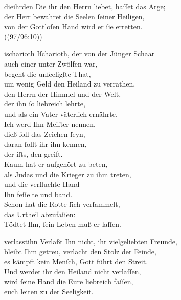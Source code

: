 \documentclass[tocstyle=ref-genre]{ees}
\begin{document}
{  \begin{movement}{dieihrden}
    \voice[Coro]
    Die ihr den Herrn liebet, haſſet das Arge;\\
    der Herr bewahret die Seelen ſeiner Heiligen,\\
    von der Gottloſen Hand wird er ſie erretten.\\
    ((97/96:10))
  \end{movement}

  \begin{movement}{ischarioth}
    \voice[Soprano]
    Iſcharioth, der von der Jünger Schaar\\
    auch einer unter Zwölfen war,\\
    begeht die unſeeligſte That,\\
    um wenig Geld den Heiland zu verrathen,\\
    den Herrn der Himmel und der Welt,\\
    der ihn ſo liebreich lehrte,\\
    und als ein Vater väterlich ernährte.\\
    Ich werd Ihn Meiſter nennen,\\
    dieß ſoll das Zeichen ſeyn,\\
    daran ſollt ihr ihn kennen,\\
    der iſts, den greift.\\
    Kaum hat er aufgehört zu beten,\\
    als Judas und die Krieger zu ihm treten,\\
    und die verfluchte Hand\\
    Ihn feſſelte und band.\\
    Schon hat die Rotte ſich verſammelt,\\
    das Urtheil abzufaſſen:\\
    Tödtet Ihn, ſein Leben muß er laſſen.
  \end{movement}

  \begin{movement}{verlasstihn}
    \voice[Soprano]
    Verlaßt Ihn nicht, ihr vielgeliebten Freunde,\\
    bleibt Ihm getreu, verlacht den Stolz der Feinde,\\
    es kämpft kein Menſch, Gott führt den Streit.\\[1ex]
    Und werdet ihr den Heiland nicht verlaſſen,\\
    wird ſeine Hand die Eure liebreich faſſen,\\
    euch leiten zu der Seeligkeit.
  \end{movement}

}
\end{document}
